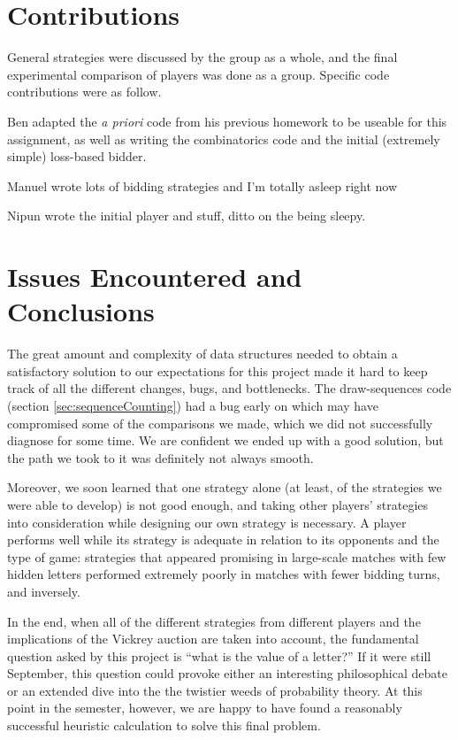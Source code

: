 \documentclass[11pt]{article}
\begin{document}
\section{Contributions}
General strategies were discussed by the group as a whole, and the final experimental comparison of players was done as a group.  Specific code contributions were as follow.

Ben adapted the {\it a priori} code from his previous homework to be useable for this assignment, as well as writing the combinatorics code and the initial (extremely simple) loss-based bidder.

Manuel wrote lots of bidding strategies and I'm totally asleep right now

Nipun wrote the initial player and stuff, ditto on the being sleepy.

\section{Issues Encountered and Conclusions}

The great amount and complexity of data structures needed to obtain a satisfactory solution to our expectations for this project made it hard to keep track of all the different changes, bugs, and bottlenecks. The draw-sequences code (section \ref{sec:sequenceCounting}) had a bug early on which may have compromised some of the comparisons we made, which we did not successfully diagnose for some time.  We are confident we ended up with a good solution, but the path we took to it was definitely not always smooth.

Moreover, we soon learned that one strategy alone (at least, of the strategies we were able to develop) is not good enough, and taking other players' strategies into consideration while designing our own strategy is necessary. A player performs well while its strategy is adequate in relation to its opponents and the type of game: strategies that appeared promising in large-scale matches with few hidden letters performed extremely poorly in matches with fewer bidding turns, and inversely.

In the end, when all of the different strategies from different players and the implications of the Vickrey auction are taken into account, the fundamental question asked by this project is ``what is the value of a letter?''  If it were still September, this question could provoke either an interesting philosophical debate or an extended dive into the the twistier weeds of probability theory.  At this point in the semester, however, we are happy to have found a reasonably successful heuristic calculation to solve this final problem.
\end{document}
